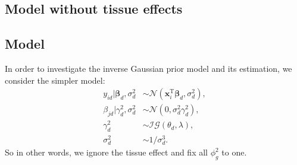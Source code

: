 \documentclass[a4paper,hidelinks]{article}\usepackage[]{graphicx}\usepackage[]{color}
\newcommand{\x}{\mathbf{x}}
\newcommand{\0}{\bm{0}}
\newcommand{\argmax}{\text{argmax} \,}
\newcommand{\tr}{^{\text{T}}}
\newcommand{\trace}{\text{tr}}
\renewcommand{\(}{\left(}
\renewcommand{\)}{\right)}
\renewcommand{\[}{\left[}
\renewcommand{\]}{\right]}
\begin{document}
\begin{appendix}

		\section{Model without tissue effects}
		\subsection{Model}
		In order to investigate the inverse Gaussian prior model and its estimation, we consider the simpler model:
		\begin{align*}
		y_{id} | \bm{\beta}_d, \sigma_d^2 & \sim \mathcal{N} (\x_i \tr \bm{\beta}_d, \sigma_d^2), \\
		\beta_{jd} | \gamma_d^2, \sigma_d^2 & \sim \mathcal{N} (0, \sigma_d^2 \gamma_d^2), \\
		\gamma_d^2 & \sim \mathcal{IG}(\theta_d, \lambda), \\
		\sigma_d^2 & \sim 1/\sigma_d^3.
		\end{align*}
		So in other words, we ignore the tissue effect and fix all $\phi_g^2$ to one. 

\end{appendix}
\end{document}
